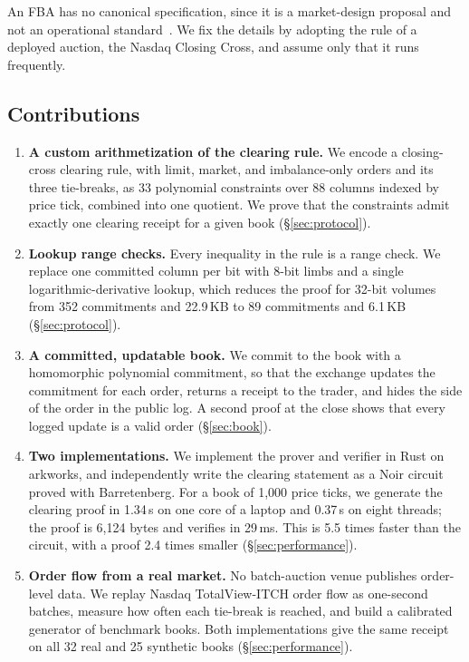 An FBA has no canonical specification, since it is a market-design proposal and not an operational standard~\cite{budish2014}. We fix the details by adopting the rule of a deployed auction, the Nasdaq Closing Cross, and assume only that it runs frequently.

\subsection{Contributions}
\label{sec:contributions}

\begin{enumerate}
  \item \textbf{A custom arithmetization of the clearing rule.} We encode a closing-cross clearing rule, with limit, market, and imbalance-only orders and its three tie-breaks, as 33 polynomial constraints over 88 columns indexed by price tick, combined into one quotient. We prove that the constraints admit exactly one clearing receipt for a given book (\S\ref{sec:protocol}).
  \item \textbf{Lookup range checks.} Every inequality in the rule is a range check. We replace one committed column per bit with 8-bit limbs and a single logarithmic-derivative lookup, which reduces the proof for 32-bit volumes from 352 commitments and 22.9\,KB to 89 commitments and 6.1\,KB (\S\ref{sec:protocol}).
  \item \textbf{A committed, updatable book.} We commit to the book with a homomorphic polynomial commitment, so that the exchange updates the commitment for each order, returns a receipt to the trader, and hides the side of the order in the public log. A second proof at the close shows that every logged update is a valid order (\S\ref{sec:book}).
  \item \textbf{Two implementations.} We implement the prover and verifier in Rust on arkworks, and independently write the clearing statement as a Noir circuit proved with Barretenberg. For a book of 1,000 price ticks, we generate the clearing proof in 1.34\,s on one core of a laptop and 0.37\,s on eight threads; the proof is 6,124 bytes and verifies in 29\,ms. This is 5.5 times faster than the circuit, with a proof 2.4 times smaller (\S\ref{sec:performance}).
  \item \textbf{Order flow from a real market.} No batch-auction venue publishes order-level data. We replay Nasdaq TotalView-ITCH order flow as one-second batches, measure how often each tie-break is reached, and build a calibrated generator of benchmark books. Both implementations give the same receipt on all 32 real and 25 synthetic books (\S\ref{sec:performance}).
\end{enumerate}
